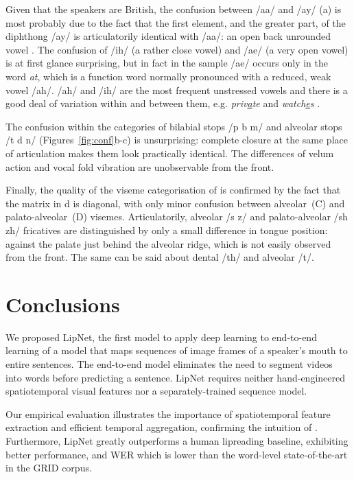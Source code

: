 \documentclass{article}
\begin{document}
Given that the speakers are British, the confusion between /aa/ and /ay/ (a) is most probably due to the fact that the first element, and the greater part, of the diphthong /ay/ is articulatorily identical with /aa/: an open back unrounded vowel \citep{ferragne2010formant}. 
The confusion of /ih/ (a rather close vowel) and /ae/ (a very open vowel) is at first glance surprising, but in fact in the sample /ae/ occurs only in the word \textit{at}, which is a function word normally pronounced with a reduced, weak vowel /ah/. /ah/ and /ih/ are the most frequent unstressed vowels and there is a good deal of variation within and between them, e.g. \textit{priv\underline{a}te} and \textit{watch\underline{e}s} \citep{cruttenden2014gimson}.

The confusion within the categories of bilabial stops /p b m/ and alveolar stops /t d n/ \mbox{(Figures~\ref{fig:conf}b-c)} is unsurprising: complete closure at the same place of articulation makes them look practically identical. The differences of velum action and vocal fold vibration are unobservable from the front. 


Finally, the quality of the viseme categorisation of \cite{neti2000audio} is confirmed by the fact that the matrix in d is diagonal, with only minor confusion between alveolar~(C) and palato-alveolar~(D) visemes. 
Articulatorily, alveolar /s z/ and palato-alveolar /sh zh/ fricatives are distinguished by only a small difference in tongue position: against the palate just behind the alveolar ridge, which is not easily observed from the front. The same can be said about dental /th/ and alveolar /t/.
 

\section{Conclusions}

We proposed LipNet, the first model to apply deep learning to end-to-end learning of a model that maps sequences of image frames of a speaker's mouth to entire sentences. The end-to-end model eliminates the need to segment videos into words before predicting a sentence. LipNet requires neither hand-engineered spatiotemporal visual features nor a separately-trained sequence model.

Our empirical evaluation illustrates the importance of spatiotemporal feature extraction and efficient temporal aggregation, confirming the intuition of \cite{easton1982perceptual}. Furthermore, LipNet greatly outperforms a human lipreading baseline, exhibiting  better performance, and  WER which is  lower than the word-level state-of-the-art \citep{gergen2016dynamic} in the GRID corpus.
\end{document}
